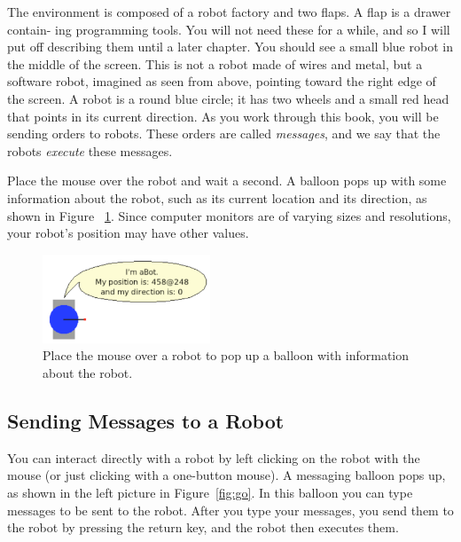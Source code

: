 \documentclass[a4paper,10pt,twoside]{book}
\begin{document}
The environment is composed of a robot factory and two flaps. A flap is a drawer contain- 
ing programming tools. You will not need these for a while, and so I will put off describing 
them until a later chapter. You should see a small blue robot in the middle of the screen. This 
is not a robot made of wires and metal, but a software robot, imagined as seen from above, 
pointing toward the right edge of the screen. A robot is a round blue circle; it has two wheels 
and a small red head that points in its current direction. As you work through this book, you 
will be sending orders to robots. These orders are called \emph{messages}, and we say that the robots 
\emph{execute} these messages. 

Place the mouse over the robot and wait a second. A balloon pops up with some information about the robot, 
such as its current location and its direction, as shown in Figure ~\ref{fig:firstBalloon}. 
Since computer monitors are of varying sizes and resolutions, your robot’s position may have 
other values.


\begin{figure}[h]\centerline{\includegraphics[width=5cm]{8-firstBalloon2}}
\caption{Place the mouse over a robot to pop up a balloon with information about the robot. \label{fig:firstBalloon}}
\end{figure}


\subsection{Sending Messages to a Robot}

You can interact directly with a robot by left clicking on the robot with the mouse (or just 
clicking with a one-button mouse). A messaging balloon pops up, as shown in the left picture 
in Figure~\ref{fig:go}. In this balloon you can type messages to be sent to the robot. After you type 
your messages, you send them to the robot by pressing the return key, and the robot then 
executes them. 
\end{document}

